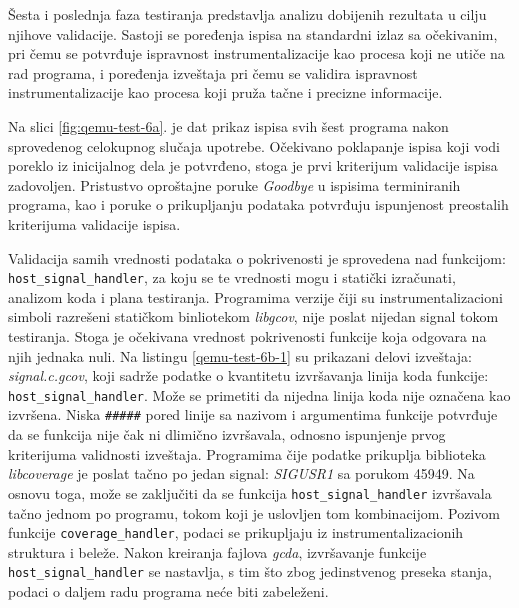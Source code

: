 \documentclass[12pt,oneside]{memoir}
\newcommand{\kod}[1]{\texttt{#1}}
\newcommand{\strano}[1]{\textit{#1}}
\begin{document}
Šesta i poslednja faza testiranja predstavlja analizu dobijenih rezultata u cilju njihove validacije. Sastoji se poređenja ispisa na standardni izlaz sa očekivanim, pri čemu se potvrđuje ispravnost instrumentalizacije kao procesa koji ne utiče na rad programa, i  poređenja izveštaja pri čemu se validira ispravnost instrumentalizacije kao procesa koji pruža tačne i precizne informacije. 

Na slici \ref{fig:qemu-test-6a}. je dat prikaz ispisa svih šest programa nakon sprovedenog celokupnog slučaja upotrebe. Očekivano poklapanje ispisa koji vodi poreklo iz inicijalnog dela je potvrđeno, stoga je prvi kriterijum validacije ispisa zadovoljen. Pristustvo oproštajne poruke \strano{Goodbye} u ispisima terminiranih programa, kao i poruke o prikupljanju podataka
potvrđuju ispunjenost preostalih kriterijuma validacije ispisa.

Validacija samih vrednosti podataka o pokrivenosti je sprovedena nad funkcijom: \kod{host\_signal\_handler}, za koju se te vrednosti mogu i statički izračunati, analizom koda i plana testiranja. Programima verzije čiji su instrumentalizacioni simboli razrešeni statičkom binliotekom \strano{libgcov}, nije poslat nijedan signal tokom testiranja. Stoga je očekivana vrednost pokrivenosti funkcije koja odgovara na njih jednaka nuli. Na listingu \ref{qemu-test-6b-1} su prikazani delovi izveštaja: \strano{signal.c.gcov}, koji sadrže podatke o kvantitetu izvršavanja linija koda funkcije: \kod{host\_signal\_handler}. Može se primetiti da nijedna linija koda nije označena kao izvršena. Niska \kod{\#\#\#\#\#} pored linije sa nazivom i argumentima funkcije potvrđuje da se funkcija nije čak ni dlimično izvršavala, odnosno ispunjenje prvog kriterijuma validnosti izveštaja. Programima čije podatke prikuplja biblioteka \strano{libcoverage} je poslat tačno po jedan signal: \strano{SIGUSR1} sa porukom 45949. Na osnovu toga, može se zaključiti da se funkcija \kod{host\_signal\_handler} izvršavala tačno jednom po programu, tokom koji je uslovljen tom kombinacijom. Pozivom funkcije \kod{coverage\_handler}, podaci se prikupljaju iz instrumentalizacionih struktura i beleže. Nakon kreiranja fajlova \strano{gcda}, izvršavanje funkcije \kod{host\_signal\_handler} se nastavlja, s tim što zbog jedinstvenog preseka stanja, podaci o daljem radu programa neće biti zabeleženi. 
\end{document}
